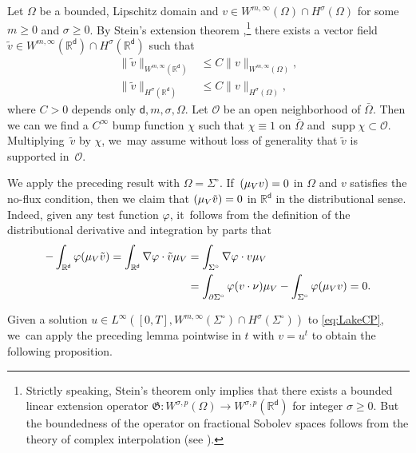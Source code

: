 \documentclass[JEP,XML,SOM,Unicode,published]{cedram}
\newcommand{\Sigmacirc}{\Sigma^\circ}
\theoremstyle{plain}
\theoremstyle{definition}
\DeclareMathOperator{\supp}{supp}
\let\div\relax
\DeclareMathOperator{\div}{\mathrm{div}}
\newcommand{\R}{{\mathbb{R}}}
\let\Om\Omega
\let\nab\nabla
\let\p\partial
\let\tl\tilde
\renewcommand{\d}{\mathsf{d}}
\begin{document}
Let $\Omega$ be a bounded, Lipschitz domain and $v\in W^{m,\infty}(\Omega) \cap H^\sigma(\Omega)$ for some $m\ge 0$ and $\sigma\ge 0$. By Stein's extension theorem \cite[Th.\,5, VI.3]{Stein1970},\footnote{Strictly speaking, Stein's theorem only implies that there exists a bounded linear extension operator $\mathfrak{G}: W^{\sigma,p}(\Om)\to W^{\sigma,p}(\R^\d)$ for integer $\sigma\geq 0$. But the boundedness of the operator on fractional Sobolev spaces follows from the theory of complex interpolation (\eg see \cite[Th.\,4.1.2, Th.\,6.4.5]{BL1976}).} there exists a vector field $\tl{v} \in W^{m,\infty}(\R^\d) \cap H^\sigma(\R^\d)$ such that\vspace*{-5pt}\enlargethispage{\baselineskip}
\begin{align*}
\|\tl{v}\|_{W^{m,\infty}(\R^\d)} &\le C \|v\|_{W^{m,\infty}(\Omega)}, \\
\|\tl{v}\|_{H^\sigma(\R^\d)} &\le C\|v\|_{H^\sigma(\Omega)},
\end{align*}
where $C>0$ depends only $\d,m,\sigma,\Omega$. Let $\mathcal{O}$ be an open neighborhood of $\bar\Omega$. Then we can we find a $C^\infty$ bump function $\chi$ such that $\chi\!\equiv\!1$ on $\bar\Omega$ and $\supp\chi\!\subset\!\mathcal{O}$. Multiplying~$\tl{v}$ by $\chi$, we~may assume without loss of generality that $\tl{v}$ is supported in~$\mathcal{O}$.

We apply the preceding result with $\Omega = \Sigmacirc$. If~$\div(\mu_V v) = 0$ in $\Omega$ and $v$ satisfies the no-flux condition, then we claim that $\div(\mu_V\tl{v}) = 0$ in $\R^\d$ in the distributional sense. Indeed, given any test function $\varphi$, it~follows from the definition of the distributional derivative and integration by parts that\vspace*{-2pt}
\begin{align*}
-\int_{\R^\d}\varphi \div(\mu_V\tl{v}) = \int_{\R^\d}\nab \varphi\cdot \tl{v}\mu_V &= \int_{\Sigmacirc}\nab\varphi\cdot v\mu_V\\
& = \int_{\p\Sigmacirc}\varphi (v\cdot\nu)\mu_V - \int_{\Sigmacirc}\varphi\div(\mu_V v) = 0.
\end{align*}

Given a solution $u\in L^\infty([0,T], W^{m,\infty}(\Sigmacirc)\cap H^\sigma(\Sigmacirc))$ to \eqref{eq:LakeCP}, we~can apply the preceding lemma pointwise in $t$ with $v=u^t$ to obtain the following proposition.
\end{document}
